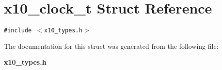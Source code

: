 \section{x10\_\-clock\_\-t Struct Reference}
\label{structx10__clock__t}
{\tt \#include $<$x10\_\-types.h$>$}



The documentation for this struct was generated from the following file:\begin{CompactItemize}
\item 
{\bf x10\_\-types.h}\end{CompactItemize}
